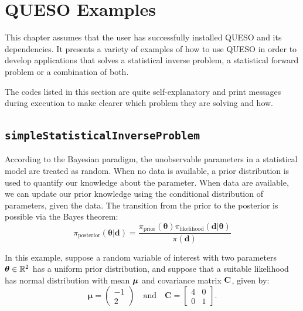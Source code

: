 

\chapter{QUESO Examples}

This chapter assumes that the user has successfully installed QUESO and its dependencies.
%
It presents a variety of  examples of how to use QUESO in order to develop applications that solves a statistical inverse problem,
a statistical forward problem or a combination of both.



The codes listed in this section are quite self-explanatory and print messages
during execution to make clearer which problem they are solving and how. 








\section{\texttt{simpleStatisticalInverseProblem}}\label{sec:exemple_sip}

According to the Bayesian paradigm, the unobservable parameters
in a statistical model are treated as random. When no data is available,
a prior distribution is used to quantify our knowledge about the parameter.
When data are available, we can update our prior knowledge using the conditional distribution of parameters, given the data. 
The transition from the prior to the posterior is possible via the Bayes theorem:
\begin{equation*}
\pi_{\text{posterior}}(\boldsymbol{\theta}|\mathbf{d})=\frac{\pi_{\text{prior}}(\boldsymbol{\theta})\pi_{\text{likelihood}}(\mathbf{d}|\boldsymbol{\theta})}{\pi(\mathbf{d})}
\end{equation*}


In this example, suppose a random variable of interest with two parameters $\mbox{\boldmath$ \theta $} \in \mathbb{R}^2$ has a uniform prior distribution, and suppose that a suitable likelihood has normal distribution with mean $\mbox{\boldmath$ \mu $}$ and covariance matrix $\bf{C}$, given by:
\begin{equation}\label{eq-example-mu}
\boldsymbol{\mu} = 
\left(\begin{array}{c}
-1 \\
2
\end{array}\right)
\quad
\text{and}
\quad
\mathbf{C} = 
\left[\begin{array}{cc}
4 & 0 \\
0 & 1
\end{array}\right].
\end{equation}

